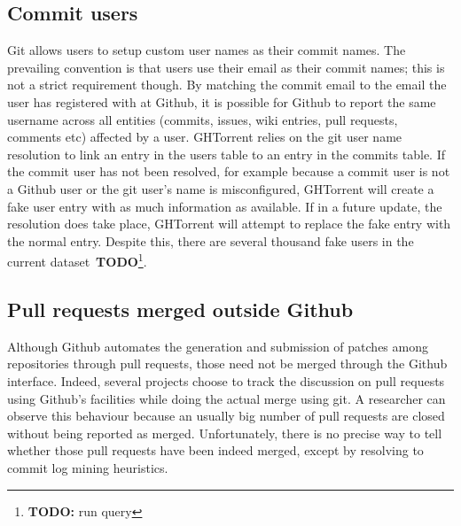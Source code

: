 \documentclass[conference]{IEEEtran}
\newcommand{\todo}[1]{\textbf{TODO}\footnote{\textbf{TODO:} #1}}
\begin{document}
\subsection{Commit users} Git allows users to setup custom user names as
    their commit names. The prevailing convention is that users use their email
    as their commit names; this is not a strict requirement though. By matching
    the commit email to the email the user has registered with at Github, it is
    possible for Github to report the same username across all entities
    (commits, issues, wiki entries, pull requests, comments etc) affected by a
    user. GHTorrent relies on the git user name resolution to link an entry in
    the \textsf{users} table to an entry in the \textsf{commits} table. If the
    commit user has not been resolved, for example because a commit user is not
    a Github user or the git user's name is misconfigured, GHTorrent will create
    a fake user entry with as much information as available. If in a future
    update, the resolution does take place, GHTorrent will attempt to replace
    the fake entry with the normal entry. Despite this, there are several
    thousand fake users in the current dataset~\todo{run query}.
    
\subsection{Pull requests merged outside Github} Although Github
    automates the generation and submission of patches among repositories
    through pull requests, those need not be merged through the Github
    interface. Indeed, several projects choose to track the discussion on pull
    requests using Github's facilities while doing the actual merge using
    {\sf git}. A researcher can observe this behaviour because an usually big
    number of pull requests are closed without being reported as merged.
    Unfortunately, there is no precise way to tell whether those pull requests
    have been indeed merged, except by resolving to commit log mining
    heuristics.

%
\end{document}
